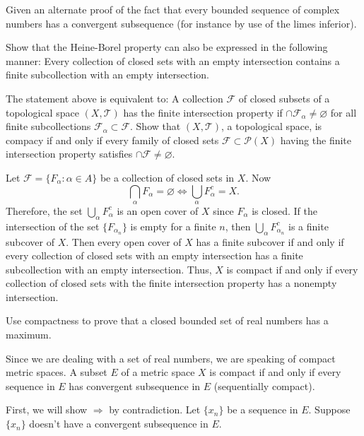 \begin{exercise}
\item
  Given an alternate proof of the fact that every bounded sequence of complex
  numbers has a convergent subsequence (for instance by use of the limes
  inferior).
\item
  Show that the Heine-Borel property can also be expressed in the following
  manner: Every collection of closed sets with an empty intersection contains
  a finite subcollection with an empty intersection.
  \par\smallskip
  The statement above is equivalent to: A collection \(\mathcal{F}\) of closed
  subsets of a topological space \((X,\mathcal{T})\) has the finite
  intersection property if \(\cap\mathcal{F}_{\alpha}\neq\varnothing\) for all
  finite subcollections \(\mathcal{F}_{\alpha}\subset\mathcal{F}\).
  Show that \((X,\mathcal{T})\), a topological space, is compacy if and only
  if every family of closed sets \(\mathcal{F}\subset\mathcal{P}(X)\) having
  the finite intersection property satisfies
  \(\cap\mathcal{F}\neq\varnothing\).
  \par\smallskip
  Let \(\mathcal{F} = \{F_{\alpha}\colon\alpha\in A\}\) be a collection of
  closed sets in \(X\).
  Now
  \[
    \bigcap_{\alpha}F_{\alpha} = \varnothing\iff\bigcup_{\alpha}F_{\alpha}^c =
    X.
  \]
  Therefore, the set \(\bigcup_{\alpha}F_{\alpha}^c\) is an open cover of
  \(X\) since \(F_{\alpha}\) is closed.
  If the intersection of the set \(\{F_{\alpha_n}\}\) is empty for a finite
  \(n\), then \(\bigcup_{\alpha}F_{\alpha_n}^c\) is a finite subcover of \(X\).
  Then every open cover of \(X\) has a finite subcover if and only if every
  collection of closed sets with an empty intersection has a finite
  subcollection with an empty intersection.
  Thus, \(X\) is compact if and only if every collection of closed sets with
  the finite intersection property has a nonempty intersection.
\item
  Use compactness to prove that a closed bounded set of real numbers has a
  maximum.
  \par\smallskip
  Since we are dealing with a set of real numbers, we are speaking of compact
  metric spaces.
  A subset \(E\) of a metric space \(X\) is compact if and only if every
  sequence in \(E\) has convergent subsequence in \(E\) (sequentially
  compact).
  \par\smallskip
  First, we will show \(\Rightarrow\) by contradiction.
  Let \(\{x_n\}\) be a sequence in \(E\).
  Suppose \(\{x_n\}\) doesn't have a convergent subsequence in \(E\).

\end{exercise}
